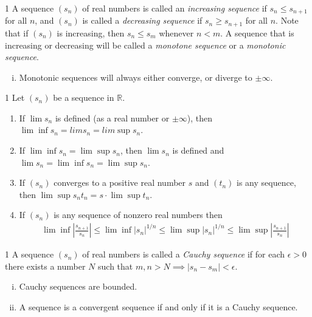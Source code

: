 \begin{defn}{1}
	A sequence $(s_n)$ of real numbers is called an \textit{increasing sequence}	if $s_n \leq s_{n+1}$ for all $n$, and $(s_n)$ is called a \textit{decreasing sequence} if
	$s_n \geq s_{n+1}$ for all $n$. Note that if $(s_n)$ is increasing, then $s_n \leq s_m$
	whenever $n < m$. A sequence that is increasing or decreasing will	be called a \textit{monotone sequence} or a \textit{monotonic sequence}.
	\begin{enumerate}[(i)]
		\item Monotonic sequences will always either converge, or diverge to $\pm \infty$.
	\end{enumerate}
\end{defn}

\newpage

\begin{theo}{1}
	Let $(s_n)$ be a sequence in $\mathbb{R}$.
	\begin{enumerate}[(i	)]
		\item If $\lim s_n$ is defined (as a real number or $\pm\infty$), then $\lim \inf s_n = lim s_n = lim \sup s_n$.
		\item If $\lim \inf s_n = \lim \sup s_n$, then $\lim s_n$ is defined and $\lim s_n =
		\lim \inf s_n = \lim \sup s_n$.
		\item If $(s_n)$ converges to a positive real number $s$ and $(t_n)$ is any sequence, then $\lim \sup s_n t_n = s\cdot \lim \sup t_n$.
		\item If $(s_n)$ is any sequence of nonzero real numbers then
		\begin{align}
			\lim \inf \left|\frac{s_{n+1}}{s_n}\right| \leq \lim \inf |s_n|^{1/n} \leq \lim \sup |s_n|^{1/n} \leq \lim \sup \left|\frac{s_{n+1}}{s_n}\right| \nonumber
		\end{align}
	\end{enumerate}
\end{theo}

\begin{defn}{1}
	A sequence $(s_n)$ of real numbers is called a \textit{Cauchy sequence} if for each $\epsilon > 0$ there exists a number $N$ such that $m,n > N \implies |s_n-s_m|<\epsilon$.
	\begin{enumerate}[(i)]
		\item Cauchy sequences are bounded.
		\item A sequence is a convergent sequence if and only if it is a Cauchy sequence. 
	\end{enumerate}	
\end{defn}

